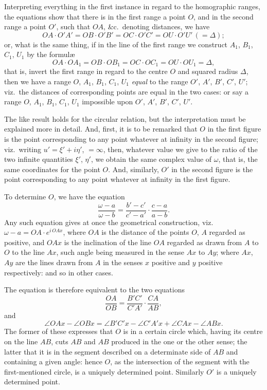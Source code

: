 \documentclass[12pt,a4paper]{article}
\begin{document}
Interpreting everything in the first instance in regard to the homographic ranges, the equations show that there is in the first range a point $O$, and in the second range a point $O'$, such that $OA$, \&c.\ denoting distances, we have
\[
OA \cdot O'A' = OB \cdot O'B' = OC \cdot O'C' = OU \cdot O'U'\, (= \Delta);
\]
or, what is the same thing, if in the line of the first range we construct $A_1$, $B_1$, $C_1$, $U_1$ by the formul\ae
\[
OA \cdot OA_1 = OB \cdot OB_1 = OC \cdot OC_1 = OU \cdot OU_1 = \Delta,
\]
that is, invert the first range in regard to the centre $O$ and squared radius $\Delta$, then we have a range $O$, $A_1$, $B_1$, $C_1$, $U_1$ \textit{equal} to the range $O'$, $A'$, $B'$, $C'$, $U'$; viz.\ the distances of corresponding points are equal in the two cases: or say a range $O$, $A_1$, $B_1$, $C_1$, $U_1$ impossible upon $O'$, $A'$, $B'$, $C'$, $U'$.

The like result holds for the circular relation, but the interpretation must be explained more in detail. And, first, it is to be remarked that $O$ in the first figure is the point corresponding to any point whatever at infinity in the second figure; viz.\ writing $u' = \xi' + i\eta'$, $= \infty$, then, whatever value we give to the ratio of the two infinite quantities $\xi'$, $\eta'$, we obtain the same complex value of $\omega$, that is, the same coordinates for the point $O$. And, similarly, $O'$ in the second figure is the point corresponding to any point whatever at infinity in the first figure.

To determine $O$, we have the equation
\[
\frac{\omega - a}{\omega - b} = \frac{b' - c'}{c' - a'} \cdot \frac{c - a}{a - b}.
\]
Any such equation gives at once the geometrical construction, viz.\ $\omega - a = OA \cdot e^{i\,OAx}$, where $OA$ is the distance of the points $O$, $A$ regarded as positive, and $OAx$ is the inclination of the line $OA$ regarded as drawn from $A$ to $O$ to the line $Ax$, such angle being measured in the sense $Ax$ to $Ay$; where $Ax$, $Ay$ are the lines drawn from $A$ in the senses $x$ positive and $y$ positive respectively: and so in other cases.

The equation is therefore equivalent to the two equations
\[
\frac{OA}{OB} = \frac{B'C'}{C'A'} \cdot \frac{CA}{AB},
\]
and
\[
\angle OAx - \angle OBx = \angle B'C'x - \angle C'A'x + \angle CAx - \angle ABx.
\]
The former of these expresses that $O$ is in a certain circle which, having its centre on the line $AB$, cuts $AB$ and $AB$ produced in the one or the other sense; the latter that it is in the segment described on a determinate side of $AB$ and containing a given angle: hence $O$, as the intersection of the segment with the first-mentioned circle, is a uniquely determined point. Similarly $O'$ is a uniquely determined point.
\end{document}
